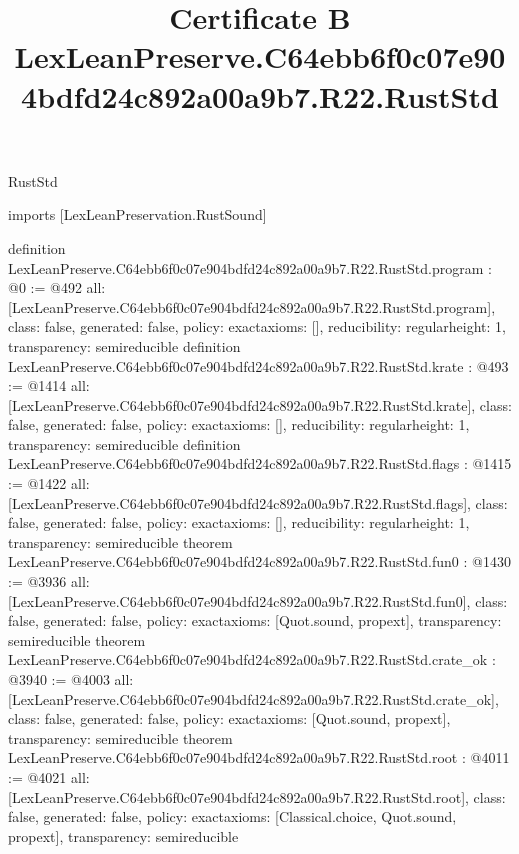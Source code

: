 \begin{lexlean}{RustStd}
\title{Certificate B LexLeanPreserve.C64ebb6f0c07e904bdfd24c892a00a9b7.R22.RustStd}
\begin{coremodule}
imports [LexLeanPreservation.RustSound]

definition LexLeanPreserve.C64ebb6f0c07e904bdfd24c892a00a9b7.R22.RustStd.program : @0 := @492 {
  all: [LexLeanPreserve.C64ebb6f0c07e904bdfd24c892a00a9b7.R22.RustStd.program],
  class: false,
  generated: false,
  policy: exact{axioms: []},
  reducibility: regular{height: 1},
  transparency: semireducible
}
definition LexLeanPreserve.C64ebb6f0c07e904bdfd24c892a00a9b7.R22.RustStd.krate : @493 := @1414 {
  all: [LexLeanPreserve.C64ebb6f0c07e904bdfd24c892a00a9b7.R22.RustStd.krate],
  class: false,
  generated: false,
  policy: exact{axioms: []},
  reducibility: regular{height: 1},
  transparency: semireducible
}
definition LexLeanPreserve.C64ebb6f0c07e904bdfd24c892a00a9b7.R22.RustStd.flags : @1415 := @1422 {
  all: [LexLeanPreserve.C64ebb6f0c07e904bdfd24c892a00a9b7.R22.RustStd.flags],
  class: false,
  generated: false,
  policy: exact{axioms: []},
  reducibility: regular{height: 1},
  transparency: semireducible
}
theorem LexLeanPreserve.C64ebb6f0c07e904bdfd24c892a00a9b7.R22.RustStd.fun0 : @1430 := @3936 {
  all: [LexLeanPreserve.C64ebb6f0c07e904bdfd24c892a00a9b7.R22.RustStd.fun0],
  class: false,
  generated: false,
  policy: exact{axioms: [Quot.sound, propext]},
  transparency: semireducible
}
theorem LexLeanPreserve.C64ebb6f0c07e904bdfd24c892a00a9b7.R22.RustStd.crate_ok : @3940 := @4003 {
  all: [LexLeanPreserve.C64ebb6f0c07e904bdfd24c892a00a9b7.R22.RustStd.crate_ok],
  class: false,
  generated: false,
  policy: exact{axioms: [Quot.sound, propext]},
  transparency: semireducible
}
theorem LexLeanPreserve.C64ebb6f0c07e904bdfd24c892a00a9b7.R22.RustStd.root : @4011 := @4021 {
  all: [LexLeanPreserve.C64ebb6f0c07e904bdfd24c892a00a9b7.R22.RustStd.root],
  class: false,
  generated: false,
  policy: exact{axioms: [Classical.choice, Quot.sound, propext]},
  transparency: semireducible
}


\end{coremodule}
\end{lexlean}
